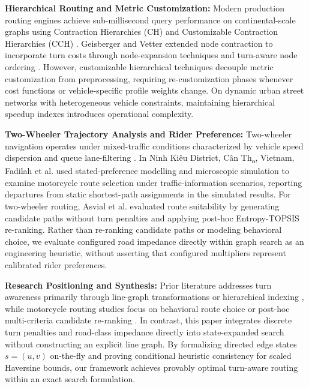 \documentclass[conference]{IEEEtran}
\begin{document}
\noindent\textbf{Hierarchical Routing and Metric Customization:} Modern production routing engines achieve sub-millisecond query performance on continental-scale graphs using Contraction Hierarchies (CH) \cite{geisberger2011efficient} and Customizable Contraction Hierarchies (CCH) \cite{bast2016route,delling2017customizable}. Geisberger and Vetter extended node contraction to incorporate turn costs through node-expansion techniques and turn-aware node ordering \cite{geisberger2011efficient}. However, customizable hierarchical techniques decouple metric customization from preprocessing, requiring re-customization phases whenever cost functions or vehicle-specific profile weights change. On dynamic urban street networks with heterogeneous vehicle constraints, maintaining hierarchical speedup indexes introduces operational complexity.

\noindent\textbf{Two-Wheeler Trajectory Analysis and Rider Preference:} Two-wheeler navigation operates under mixed-traffic conditions characterized by vehicle speed dispersion \cite{kotagi2020modeling} and queue lane-filtering \cite{promraksa2022lane}. In Ninh Ki\^{e}u District, C\^{a}n Th\textsubscript{o}, Vietnam, Fadilah et al. \cite{fadilah2024identifying} used stated-preference modelling and microscopic simulation to examine motorcycle route selection under traffic-information scenarios, reporting departures from static shortest-path assignments in the simulated results. For two-wheeler routing, Asvial et al. \cite{asvial2020entropy} evaluated route suitability by generating candidate paths without turn penalties and applying post-hoc Entropy-TOPSIS re-ranking. Rather than re-ranking candidate paths or modeling behavioral choice, we evaluate configured road impedance directly within graph search as an engineering heuristic, without asserting that configured multipliers represent calibrated rider preferences.

\noindent\textbf{Research Positioning and Synthesis:} Prior literature addresses turn awareness primarily through line-graph transformations or hierarchical indexing \cite{winter2002modeling,geisberger2011efficient}, while motorcycle routing studies focus on behavioral route choice or post-hoc multi-criteria candidate re-ranking \cite{asvial2020entropy,zografos2004heuristic,kumar2025realtime}. In contrast, this paper integrates discrete turn penalties and road-class impedance directly into state-expanded search without constructing an explicit line graph. By formalizing directed edge states $s=(u, v)$ on-the-fly and proving conditional heuristic consistency for scaled Haversine bounds, our framework achieves provably optimal turn-aware routing within an exact search formulation.
\end{document}
